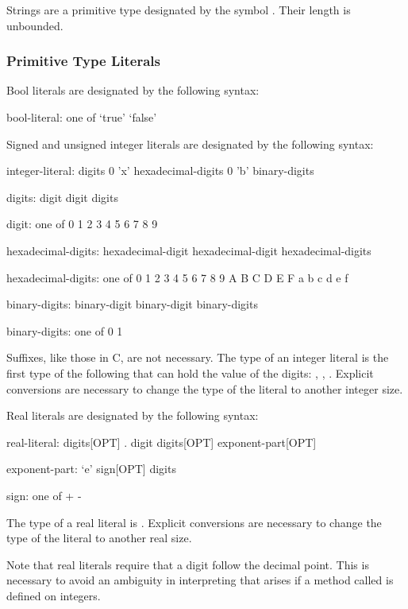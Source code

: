 Strings are a primitive type designated by the symbol .
Their length is unbounded.

\subsubsection{Primitive Type Literals}
\label{Primitive_Type_Literals}

Bool literals are designated by the following syntax:
\begin{syntax}
bool-literal: one of
  `true' `false'
\end{syntax}

Signed and unsigned integer literals are designated by the following
syntax:
\begin{syntax}
integer-literal:
  digits
  0 'x' hexadecimal-digits
  0 'b' binary-digits

digits:
  digit
  digit digits

digit: one of
  0 1 2 3 4 5 6 7 8 9

hexadecimal-digits:
  hexadecimal-digit
  hexadecimal-digit hexadecimal-digits

hexadecimal-digits: one of
  0 1 2 3 4 5 6 7 8 9 A B C D E F a b c d e f

binary-digits:
  binary-digit
  binary-digit binary-digits

binary-digits: one of
  0 1
\end{syntax}
Suffixes, like those in C, are not necessary.  The type of an integer
literal is the first type of the following that can hold the value of
the digits: , , .  Explicit
conversions are necessary to change the type of the literal to another
integer size.

Real literals are designated by the following syntax:
\begin{syntax}
real-literal:
  digits[OPT] . digit digits[OPT] exponent-part[OPT]

exponent-part:
  `e' sign[OPT] digits

sign: one of
  + -
\end{syntax}
The type of a real literal is .  Explicit conversions are
necessary to change the type of the literal to another real
size.

Note that real literals require that a digit follow the
decimal point.  This is necessary to avoid an ambiguity in
interpreting  that arises if a method called  is
defined on integers.

